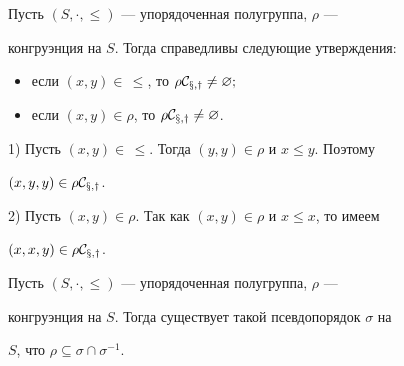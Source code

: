 \begin{lem} 


Пусть $(S,\cdot,\le)$ --- упорядоченная полугруппа, $\rho$ --- 


конгруэнция на $S$. Тогда справедливы следующие утверждения$:$ 


\begin{itemize} 


\item[1)] если $(x,y)\in\,\le$, то $\rho\cal C_{x,y}\ne\varnothing;$ 


\item[2)] если $(x,y)\in\rho$, то $\rho\cal C_{x,y}\ne\varnothing$. 


\end{itemize} 


\end{lem} 


 


\begin{pf} 


1) Пусть $(x,y)\in\,\le$. Тогда $(y,y)\in\rho$ и $x\le y$. Поэтому 


$(x,y,y)\in\rho\cal C_{x,y}$. 


 


2) Пусть $(x,y)\in\rho$. Так как $(x,y)\in\rho$ и $x\le x$, то имеем 


$(x,x,y)\in\rho\cal C_{x,y}$. 


\end{pf} 


 


\begin{prop} 


Пусть $(S,\cdot,\le)$ --- упорядоченная полугруппа, $\rho$ --- 


конгруэнция на $S$. Тогда существует такой псевдопорядок $\sigma$ на 


$S$, что $\rho\subseteq\sigma\cap\sigma^{-1}$. 


\end{prop} 


 


